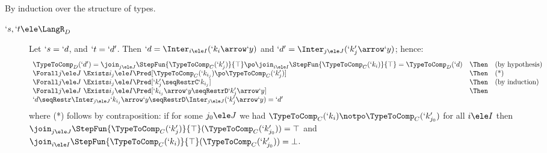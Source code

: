 \documentclass{CSML}
\begin{document}
\proof%
By induction over the structure of types. 
 \begin{description}

 \item [$ `s,`t \ele \LangR_D $] 
Let $ `s = `d$, and $`t=`d'$.
Then $`d = \Inter_{i \ele I}(`k_i\arrow `y)$ and $`d' = \Inter_{j \ele J}(`k'_j\arrow `y)$; hence:	
%
%
 \[ \begin{array}{lll}
\TypeToComp_D(`d') = \join_{j \ele J} \StepFun{\TypeToComp_C(`k'_j) }{ \top} \po \join_{i \ele I} \StepFun{\TypeToComp_C(`k_i) }{ \top} = \TypeToComp_D(`d) & \Then & (\textrm{by hypothesis}) \\ %
\Forall j \ele J\ \Exists i_j \ele I \Pred[ \TypeToComp_C(`k_{i_j}) \po \TypeToComp_C(`k'_j) ] & \Then & (\textrm{*}) \\ %
\Forall j \ele J\ \Exists i_j \ele I \Pred[ `k'_j \seqRestrC `k_{i_j} ] & \Then & (\textrm{by induction}) \\ %
\Forall j \ele J\ \Exists i_j \ele I \Pred[ `k_{i_j}\arrow `y \seqRestrD `k'_j\arrow `y ] & \Then & \\
`d \seqRestr \Inter_{j \ele J} `k_{i_j}\arrow `y \seqRestrD \Inter_{j \ele J}(`k'_j\arrow `y) = `d'
 \end{array} \]
where (*) follows by contraposition: if for some $j_0 \ele J$ we had 
$\TypeToComp_C(`k_i) \notpo \TypeToComp_C(`k'_{j_0})$ for all $i \ele I$ then 
$\join_{j \ele J} \StepFun{\TypeToComp_C(`k'_j) }{ \top}(\TypeToComp_C(`k'_{j_0})) = \top$ and 
$\join_{i \ele I} \StepFun{\TypeToComp_C(`k_i) }{ \top} (\TypeToComp_C(`k'_{j_0})) = \bot$.


\end{description}
\end{document}

